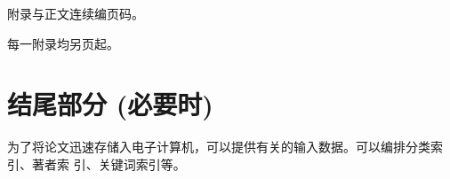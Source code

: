 \documentclass[master]{njuthesis}
\begin{document}
\begin{enumerate}
\begin{enumerate}
\begin{enumerate}
\begin{enumerate}
附录与正文连续编页码。

每一附录均另页起。

\section{结尾部分 (必要时)}

为了将论文迅速存储入电子计算机，可以提供有关的输入数据。可以编排分类索引、著者索
引、关键词索引等。

\backmatter


\nocite{*}


%
%


\end{enumerate}
\end{enumerate}
\end{enumerate}
\end{enumerate}
\end{document}

